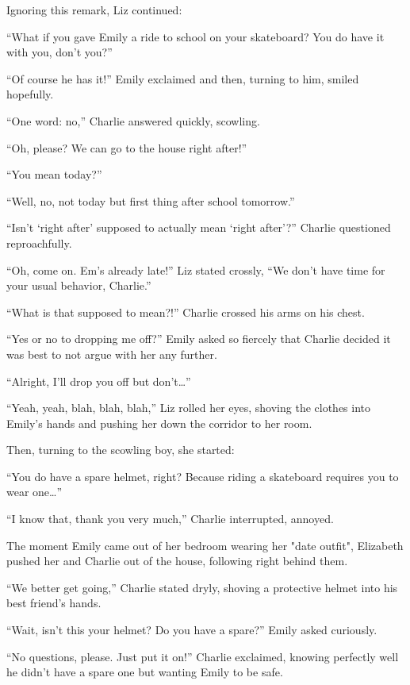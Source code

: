 Ignoring this remark, Liz continued:

“What if you gave Emily a ride to school on your skateboard? You do have it with you, don’t you?”
  
“Of course he has it!” Emily exclaimed and then, turning to him, smiled hopefully.

“One word: no,” Charlie answered quickly, scowling.

“Oh, please? We can go to the house right after!”

“You mean today?”

“Well, no, not today but first thing after school tomorrow.”

“Isn’t ‘right after’ supposed to actually mean ‘right after’?” Charlie questioned reproachfully.

“Oh, come on. Em’s already late!” Liz stated crossly, “We don’t have time for your usual behavior, Charlie.”

“What is that supposed to mean?!” Charlie crossed his arms on his chest.

“Yes or no to dropping me off?” Emily asked so fiercely that Charlie decided it was best to not argue with her any further.

“Alright, I’ll drop you off but don’t…”

“Yeah, yeah, blah, blah, blah,” Liz rolled her eyes, shoving the clothes into Emily’s hands and pushing her down the corridor to her room.

Then, turning to the scowling boy, she started:
  
“You do have a spare helmet, right? Because riding a skateboard requires you to wear one…”
  
“I know that, thank you very much,” Charlie interrupted, annoyed.

The moment Emily came out of her bedroom wearing her "date outfit", Elizabeth pushed her and Charlie out of the house, following right behind them.
  
“We better get going,” Charlie stated dryly, shoving a protective helmet into his best friend’s hands.

“Wait, isn’t this your helmet? Do you have a spare?” Emily asked curiously.

“No questions, please. Just put it on!” Charlie exclaimed, knowing perfectly well he didn’t have a spare one but wanting Emily to be safe.